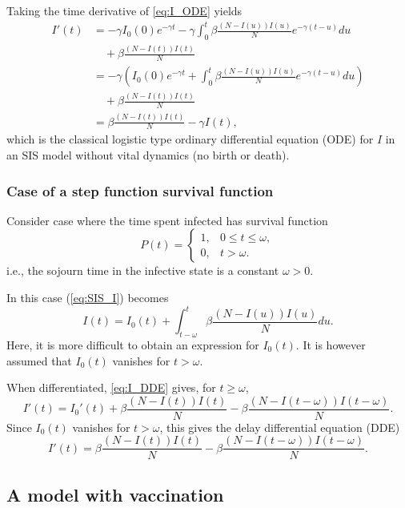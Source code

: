 \documentclass[aspectratio=169]{beamer}\usepackage[]{graphicx}\usepackage[]{xcolor}
\begin{document}
\begin{frame}
Taking the time derivative of \eqref{eq:I_ODE} yields
\begin{align*}
I'(t) &= -\gamma I_0(0)e^{-\gamma t}-\gamma\int_0^t
\beta\frac{(N-I(u))I(u)}{N}e^{-\gamma(t-u)}du \\
&\quad +\beta \frac{(N-I(t))I(t)}{N} \\
&= -\gamma\left(I_0(0)e^{-\gamma t}+
\int_0^t \beta\frac{(N-I(u))I(u)}{N}e^{-\gamma(t-u)}du\right) \\
&\quad +\beta \frac{(N-I(t))I(t)}{N} \\
&= \beta \frac{(N-I(t))I(t)}{N}-\gamma I(t),
\end{align*}
which is the classical logistic type ordinary differential equation
(ODE) for $I$ in an SIS model without vital dynamics (no birth or death).
\end{frame}



\begin{frame}\frametitle{Case of a step function survival function}
Consider case where the time spent infected has survival function 
\[
P(t)=\begin{cases}
1, & 0\leq t\leq\omega,\\
0, & t>\omega.
\end{cases}
\]
i.e., the sojourn time in the infective state is a constant
$\omega>0$.
 
In this case (\ref{eq:SIS_I}) becomes
\begin{equation}\label{eq:I_DDE}
I(t)=I_0(t)+\int_{t-\omega}^t \beta\frac{(N-I(u))I(u)}{N} du.
\end{equation}
Here, it is more difficult to obtain an expression for $I_0(t)$. It is however
assumed that $I_0(t)$ vanishes for $t>\omega$.
\end{frame}

\begin{frame}
When differentiated, \eqref{eq:I_DDE} gives, for $t\geq\omega$,
\[
I'(t)=I_0'(t)+\beta\frac{(N-I(t))I(t)}{N}
-\beta\frac{\left(N-I(t-\omega)\right)I(t-\omega)}{N}.
\]
Since $I_0(t)$ vanishes for $t>\omega$, this gives the delay
differential equation (DDE)
\[
I'(t)=\beta\frac{(N-I(t))I(t)}{N}
-\beta\frac{(N-I(t-\omega))I(t-\omega)}{N}.
\]
\end{frame}



\subsection{A model with vaccination}
\end{document}
